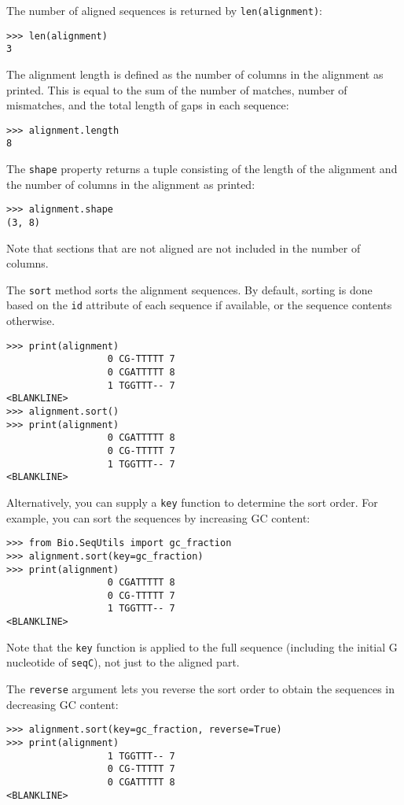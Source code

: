 The number of aligned sequences is returned by \verb+len(alignment)+:
\begin{verbatim}
>>> len(alignment)
3
\end{verbatim}
The alignment length is defined as the number of columns in the alignment as
printed. This is equal to the sum of the number of matches, number of
mismatches, and the total length of gaps in each sequence:
\begin{verbatim}
>>> alignment.length
8
\end{verbatim}

The \verb+shape+ property returns a tuple consisting of the length of the
alignment and the number of columns in the alignment as printed:

\begin{verbatim}
>>> alignment.shape
(3, 8)
\end{verbatim}
Note that sections that are not aligned are not included in the number of columns.

The \verb+sort+ method sorts the alignment sequences. By default, sorting is done based on the \verb+id+ attribute of each sequence if available, or the sequence contents otherwise.
\begin{verbatim}
>>> print(alignment)
                  0 CG-TTTTT 7
                  0 CGATTTTT 8
                  1 TGGTTT-- 7
<BLANKLINE>
>>> alignment.sort()
>>> print(alignment)
                  0 CGATTTTT 8
                  0 CG-TTTTT 7
                  1 TGGTTT-- 7
<BLANKLINE>
\end{verbatim}
Alternatively, you can supply a \verb+key+ function to determine the sort order. For example, you can sort the sequences by increasing GC content:
\begin{verbatim}
>>> from Bio.SeqUtils import gc_fraction
>>> alignment.sort(key=gc_fraction)
>>> print(alignment)
                  0 CGATTTTT 8
                  0 CG-TTTTT 7
                  1 TGGTTT-- 7
<BLANKLINE>
\end{verbatim}
Note that the \verb+key+ function is applied to the full sequence (including the initial G nucleotide of \verb|seqC|), not just to the aligned part.

The \verb+reverse+ argument lets you reverse the sort order to obtain the sequences in decreasing GC content:
\begin{verbatim}
>>> alignment.sort(key=gc_fraction, reverse=True)
>>> print(alignment)
                  1 TGGTTT-- 7
                  0 CG-TTTTT 7
                  0 CGATTTTT 8
<BLANKLINE>
\end{verbatim}

